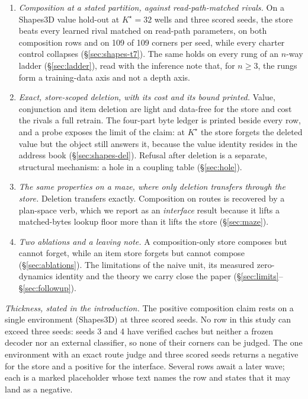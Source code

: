 \documentclass{article} %
\newcommand{\Kstar}{\ensuremath{K^{\star}}}
\begin{document}
\begin{enumerate}[leftmargin=*,itemsep=2pt]
\item \emph{Composition at a stated partition, against read-path-matched rivals.} On a
  Shapes3D value hold-out at $\Kstar=32$ wells and three scored seeds, the store beats every %
  learned rival matched on read-path parameters, on both composition rows and on 109 of 109 %
  corners per seed, while every charter control collapses
  (\S\ref{sec:shapes-t7}). The same holds on every rung of an $n$-way ladder
  (\S\ref{sec:ladder}), read with the inference note that, for $n\ge3$, the rungs form a
  training-data axis and not a depth axis.
\item \emph{Exact, store-scoped deletion, with its cost and its bound printed.} Value, conjunction and item deletion are light and data-free for the store and cost the rivals a full retrain. The four-part byte ledger is printed beside every row, and a probe exposes the
  limit of the claim: at $\Kstar$ the store forgets the deleted value but the object still
  answers it, because the value identity resides in the address book (\S\ref{sec:shapes-del}).
  Refusal after deletion is a separate, structural mechanism: a hole in a coupling table
  (\S\ref{sec:hole}).
\item \emph{The same properties on a maze, where only deletion transfers through the
  store.} Deletion transfers exactly. Composition on routes is recovered by a plan-space verb,
  which we report as an \emph{interface} result because it lifts a matched-bytes lookup
  floor more than it lifts the store (\S\ref{sec:maze}).
\item \emph{Two ablations and a leaving note.} A composition-only store composes but cannot
  forget, while an item store forgets but cannot compose (\S\ref{sec:ablations}). The
  limitations of the naive unit, its measured zero-dynamics identity and the theory we carry
  close the paper (\S\ref{sec:limits}--\S\ref{sec:followup}).
\end{enumerate}

\noindent\emph{Thickness, stated in the introduction.} The positive composition claim rests
on a single environment (Shapes3D) at three scored seeds. No row in this study can exceed three
seeds: seeds 3 and 4 have verified caches but neither a frozen decoder nor an external
classifier, so none of their corners can be judged. %
The one environment with an exact route judge and three scored seeds returns a negative for
the store and a positive for the interface. Several rows await a later wave; each is a
marked placeholder whose text names the row and states that it may land as a negative.
\end{document}
